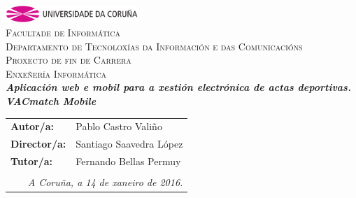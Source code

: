 \begin{titlepage}
\begin{center}
\includegraphics[width=5cm]{img/anagramaUDC.png}\\[0.5cm]
{\textsc{Facultade de Informática}} \\
{\large \textsc{Departamento de Tecnoloxías da Información e das Comunicacións}} \\[1cm]
{\Large \textsc{Proxecto de fin de Carrera}} \\
{\Large \textsc{Enxeñería Informática}} \\[2cm]
{\Large \textsl{\textbf{Aplicación web e mobil para a xestión electrónica de actas 
deportivas.}}} \\[0.15cm]
{\Large \textsl{\textbf{VACmatch Mobile}}} \\
\vfill
\begin{flushright}
\begin{tabular}{ll}
\textbf{Autor/a:}    & Pablo Castro Valiño \\
\textbf{Director/a:} & Santiago Saavedra López\\
\textbf{Tutor/a:} & Fernando Bellas Permuy\\
& \\
\multicolumn{2}{r}{\small \emph{A Coruña, a 14 de xaneiro de 2016.}} \\
\end{tabular}
\end{flushright}
\end{center}
\end{titlepage}
